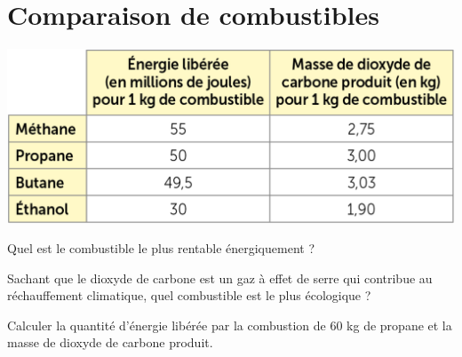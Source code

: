 \section{Comparaison de combustibles}\label{ex:comparaison}

\begin{center}
	\includegraphics[scale=0.5]{img/tab_combustibles}
\end{center}

\begin{questions}
	\question Quel est le combustible le plus rentable énergiquement ?
	
	\question Sachant que le dioxyde de carbone est un gaz à effet de serre qui contribue au réchauffement climatique, quel combustible est le plus écologique ?
	
	\question Calculer la quantité d'énergie libérée par la combustion de 60 kg de propane et la masse de dioxyde de carbone produit.
\end{questions}